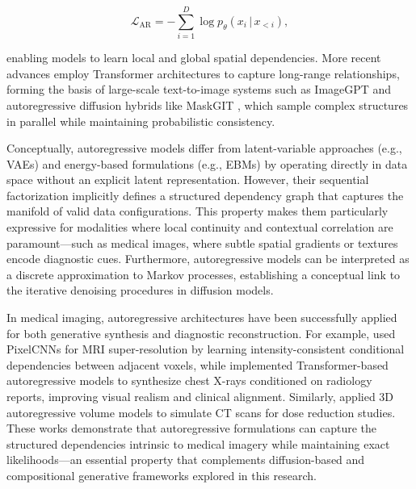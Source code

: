 \begin{equation}
    \mathcal{L}_{\text{AR}} = - \sum_{i=1}^{D} \log p_\theta(x_i \,|\, x_{<i}),
\end{equation}

enabling models to learn local and global spatial dependencies. More recent advances employ Transformer architectures to capture long-range relationships, forming the basis of large-scale text-to-image systems such as ImageGPT \cite{chen2020imagegpt} and autoregressive diffusion hybrids like MaskGIT \cite{chang2022maskgit}, which sample complex structures in parallel while maintaining probabilistic consistency.  

\vspace{1em}

Conceptually, autoregressive models differ from latent-variable approaches (e.g., VAEs) and energy-based formulations (e.g., EBMs) by operating directly in data space without an explicit latent representation. However, their sequential factorization implicitly defines a structured dependency graph that captures the manifold of valid data configurations. This property makes them particularly expressive for modalities where local continuity and contextual correlation are paramount—such as medical images, where subtle spatial gradients or textures encode diagnostic cues. Furthermore, autoregressive models can be interpreted as a discrete approximation to Markov processes, establishing a conceptual link to the iterative denoising procedures in diffusion models.  

\vspace{1em}

In medical imaging, autoregressive architectures have been successfully applied for both generative synthesis and diagnostic reconstruction. For example, \cite{peng2021pixelcnn_mri} used PixelCNNs for MRI super-resolution by learning intensity-consistent conditional dependencies between adjacent voxels, while \cite{liu2022transformer_cxr} implemented Transformer-based autoregressive models to synthesize chest X-rays conditioned on radiology reports, improving visual realism and clinical alignment. Similarly, \cite{zhao2023ar_ct} applied 3D autoregressive volume models to simulate CT scans for dose reduction studies. These works demonstrate that autoregressive formulations can capture the structured dependencies intrinsic to medical imagery while maintaining exact likelihoods—an essential property that complements diffusion-based and compositional generative frameworks explored in this research.  

